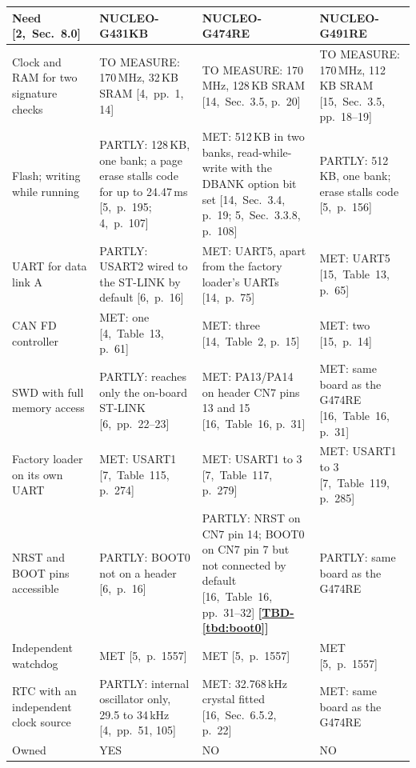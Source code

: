 \documentclass[11pt,a4paper]{article}
\newcommand{\tbd}[1]{\mbox{\textbf{[\hyperref[tbd:#1]{TBD-\ref*{tbd:#1}}]}}}
\begin{document}
\smallskip
{\footnotesize\noindent\begin{tabularx}{\textwidth}{@{}>{\raggedright\arraybackslash}p{2.8cm}>{\raggedright\arraybackslash}X>{\raggedright\arraybackslash}X>{\raggedright\arraybackslash}X@{}}
\toprule
Need [2,~Sec.~8.0] & NUCLEO-G431KB & NUCLEO-G474RE & NUCLEO-G491RE \\
\midrule
Clock and RAM for two signature checks & TO MEASURE: 170\,MHz, 32\,KB SRAM [4,~pp.~1, 14] & TO MEASURE: 170\,MHz, 128\,KB SRAM [14,~Sec.~3.5, p.~20] & TO MEASURE: 170\,MHz, 112\,KB SRAM [15,~Sec.~3.5, pp.~18--19] \\
Flash; writing while running & PARTLY: 128\,KB, one bank; a page erase stalls code for up to 24.47\,ms [5,~p.~195; 4,~p.~107] & MET: 512\,KB in two banks, read-while-write with the DBANK option bit set [14,~Sec.~3.4, p.~19; 5,~Sec.~3.3.8, p.~108] & PARTLY: 512\,KB, one bank; erase stalls code [5,~p.~156] \\
UART for data link A & PARTLY: USART2 wired to the ST-LINK by default [6,~p.~16] & MET: UART5, apart from the factory loader's UARTs [14,~p.~75] & MET: UART5 [15,~Table~13, p.~65] \\
CAN FD controller & MET: one [4,~Table~13, p.~61] & MET: three [14,~Table~2, p.~15] & MET: two [15,~p.~14] \\
SWD with full memory access & PARTLY: reaches only the on-board ST-LINK [6,~pp.~22--23] & MET: PA13/PA14 on header CN7 pins 13 and 15 [16,~Table~16, p.~31] & MET: same board as the G474RE [16,~Table~16, p.~31] \\
Factory loader on its own UART & MET: USART1 [7,~Table~115, p.~274] & MET: USART1 to 3 [7,~Table~117, p.~279] & MET: USART1 to 3 [7,~Table~119, p.~285] \\
NRST and BOOT pins accessible & PARTLY: BOOT0 not on a header [6,~p.~16] & PARTLY: NRST on CN7 pin 14; BOOT0 on CN7 pin 7 but not connected by default [16,~Table~16, pp.~31--32] \tbd{boot0} & PARTLY: same board as the G474RE \\
Independent watchdog & MET [5,~p.~1557] & MET [5,~p.~1557] & MET [5,~p.~1557] \\
RTC with an independent clock source & PARTLY: internal oscillator only, 29.5 to 34\,kHz [4,~pp.~51, 105] & MET: 32.768\,kHz crystal fitted [16,~Sec.~6.5.2, p.~22] & MET: same board as the G474RE \\
Owned & YES & NO & NO \\
\bottomrule
\end{tabularx}}

\end{document}
